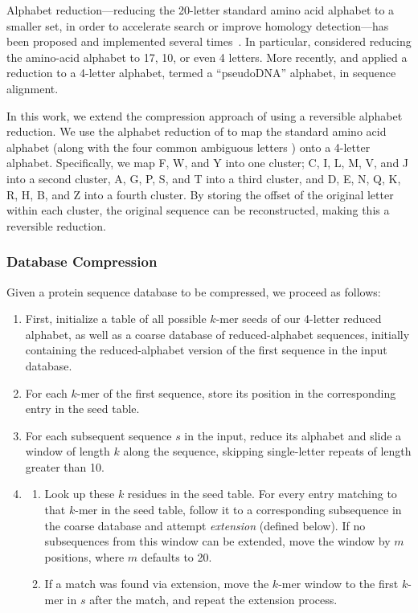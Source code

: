 \documentclass[review,preprint,12pt]{elsarticle}
\renewcommand{\cite}{\citep} %
\theoremstyle{definition}
\theoremstyle{remark}
\begin{document}
Alphabet reduction---reducing the 20-letter standard amino acid alphabet to a
smaller set, in order to accelerate search or improve homology detection---has
been proposed and implemented several times~\cite{bacardit2007automated, peterson2009reduced}.
In particular, \citet{murphy2000simplified} considered reducing the
amino-acid alphabet to 17, 10, or even 4 letters.
More recently, \citet{zhao2012rapsearch2} and \citet{huson2013poor} applied a reduction to
a 4-letter alphabet, termed a ``pseudoDNA'' alphabet, in sequence alignment.

In this work, we extend the compression approach of 
\citet{daniels2013compressive} using a reversible alphabet reduction.
We use the alphabet reduction of \citet{murphy2000simplified} to map the 
standard amino
acid alphabet (along with the four common ambiguous letters ) onto a 4-letter 
alphabet.
Specifically, we map F, W, and Y into one cluster; C, I, L, M, V, and J into
a second cluster, A, G, P, S, and T into a third cluster, and
D, E, N, Q, K, R, H, B, and Z into a fourth cluster.
By storing the offset of the original letter within each cluster, the original
sequence can be reconstructed, making this a reversible reduction.

\subsubsection{Database Compression}

Given a protein sequence database to be compressed, we proceed as follows:
\begin{enumerate}
        \item First, initialize a table of all possible $k$-mer seeds of
        our 4-letter reduced alphabet, as well as a coarse database of
        reduced-alphabet sequences, initially containing the reduced-alphabet
        version of the first sequence in the input database.
        \item For each $k$-mer of the first sequence, store its position in the
        corresponding entry in the seed table.
        \item For each subsequent sequence $s$ in the input, reduce its 
        alphabet and slide a window of 
        length $k$ along the sequence, skipping single-letter repeats of length
        greater than 10.
        \item
        \begin{enumerate}
        \item Look up these $k$ residues in the seed table.
        For every entry matching to that $k$-mer in the seed table, follow
        it to a corresponding subsequence in the coarse database and attempt
        \textit{extension} (defined below).
        If no subsequences from this window can be extended, move the window
        by $m$ positions, where $m$ defaults to 20.
        \item If a match was found via extension, move the $k$-mer window to
        the first $k$-mer in $s$ after the match, and repeat the extension
        process.
        \end{enumerate}
\end{enumerate}
        
\end{document}
